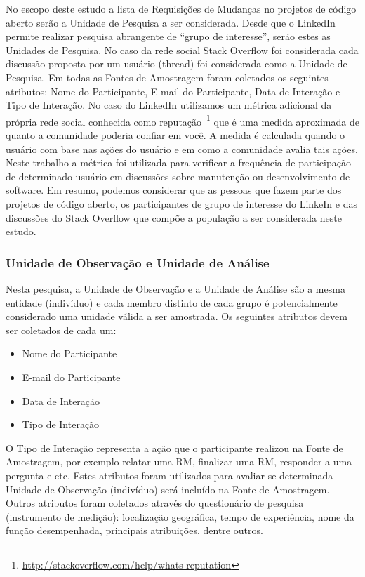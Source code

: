 No escopo deste estudo a lista de Requisições de Mudanças no projetos de código
aberto serão a Unidade de Pesquisa a ser considerada. Desde que o LinkedIn
permite realizar pesquisa abrangente de ``grupo de interesse'', serão estes as
Unidades de Pesquisa. No caso da rede social Stack Overflow foi considerada cada
discussão proposta por um usuário (thread) foi considerada como a Unidade de
Pesquisa. Em todas as Fontes de Amostragem foram coletados os seguintes
atributos: Nome do Participante, E-mail do Participante, Data de Interação e
Tipo de Interação. No caso do LinkedIn utilizamos um métrica
adicional da própria rede social conhecida como
reputação~\footnote{\url{http://stackoverflow.com/help/whats-reputation}} que é
uma medida aproximada de quanto a comunidade poderia confiar em você. A medida é
calculada quando o usuário com base nas ações do usuário e em como a comunidade
avalia tais ações. Neste trabalho a métrica foi utilizada para verificar a
frequência de participação de determinado usuário em discussões sobre manutenção
ou desenvolvimento de software. Em resumo, podemos considerar que as pessoas que
fazem parte dos projetos de código aberto, os participantes de grupo de
interesse do LinkeIn e das discussões do Stack Overflow  que compõe a população
a ser considerada neste estudo.

\subsubsection{Unidade de Observação e Unidade de Análise}

Nesta pesquisa, a Unidade de Observação e a Unidade de Análise são a mesma
entidade (indivíduo) e cada membro distinto de cada grupo é potencialmente
considerado uma unidade válida a ser amostrada. Os seguintes atributos devem ser
coletados de cada um:
\begin{itemize}
	\item Nome do Participante
	\item E-mail do Participante
	\item Data de Interação
	\item Tipo de Interação
\end{itemize}

O Tipo de Interação representa a ação que o participante realizou na Fonte de
Amostragem, por exemplo relatar uma RM, finalizar uma RM, responder a uma
pergunta e etc. Estes atributos foram utilizados para avaliar se determinada
Unidade de Observação (indivíduo) será incluído na Fonte de Amostragem. Outros
atributos foram coletados através do questionário de pesquisa (instrumento de
medição): localização geográfica, tempo de experiência, nome da função
desempenhada, principais atribuições, dentre outros.

